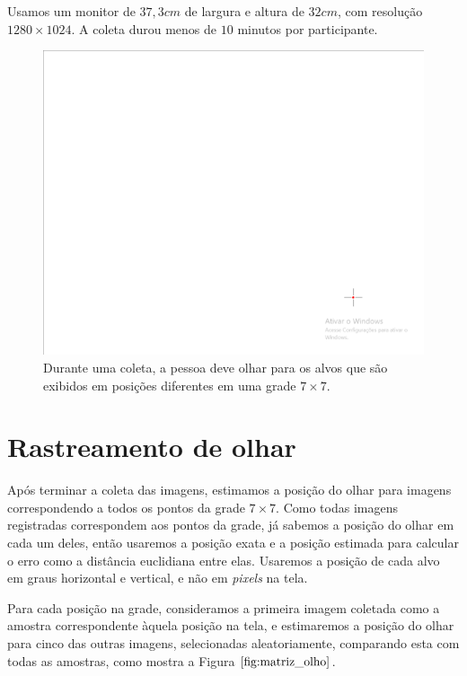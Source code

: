 Usamos um monitor de $37,3cm$ de largura e altura de $32cm$, com resolução $1280 \times 1024$. A coleta durou menos de $10$ minutos por participante.

\begin{figure}
\centering
\includegraphics[scale=1]{imagens/alvo.png}
\caption{Durante uma coleta, a pessoa deve olhar para os alvos que são exibidos em posições diferentes em uma grade $7 \times 7$.}
\label{fig:alvo}
\end{figure}

\section{Rastreamento de olhar}

Após terminar a coleta das imagens, estimamos a posição do olhar para imagens correspondendo a todos os pontos da grade $7 \times 7$. Como todas imagens registradas correspondem aos pontos da grade, já sabemos a posição do olhar em cada um deles, então usaremos a posição exata e a posição estimada para calcular o erro como a distância euclidiana entre elas. Usaremos a posição de cada alvo em graus horizontal e vertical, e não em \textit{pixels} na tela.

Para cada posição na grade, consideramos a primeira imagem coletada como a amostra correspondente àquela posição na tela, e estimaremos a posição do olhar para cinco das outras imagens, selecionadas aleatoriamente, comparando esta com todas as amostras, como mostra a Figura $\ref{fig:matriz_olho}$.

